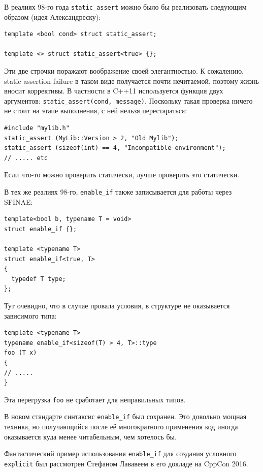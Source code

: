 \documentclass[a4paper,12pt,oneside]{article}
\begin{document}
В реалиях 98-го года \lstinline!static_assert! можно было бы реализовать следующим образом (идея Александреску):

\begin{lstlisting}
template <bool cond> struct static_assert;

template <> struct static_assert<true> {};
\end{lstlisting}

Эти две строчки поражают воображение своей элегантностью. К сожалению, static assertion failure в таком виде получается почти нечитаемой, поэтому жизнь вносит коррективы. В частности в C++11 используется функция двух аргументов: \lstinline!static_assert(cond, message)!. Поскольку такая проверка ничего не стоит на этапе выполнения, с ней нельзя перестараться:

\begin{lstlisting}
#include "mylib.h"
static_assert (MyLib::Version > 2, "Old Mylib");
static_assert (sizeof(int) == 4, "Incompatible environment");
// ..... etc
\end{lstlisting}

Если что-то можно проверить статически, лучше проверить это статически.

В тех же реалиях 98-го, \lstinline!enable_if! также записывается для работы через SFINAE:

\begin{lstlisting}
template<bool b, typename T = void>
struct enable_if {};

template <typename T>
struct enable_if<true, T> 
{
  typedef T type;
};
\end{lstlisting}

Тут очевидно, что в случае провала условия, в структуре не оказывается зависимого типа:

\begin{lstlisting}
template <typename T>
typename enable_if<sizeof(T) > 4, T>::type
foo (T x) 
{ 
// .....
}
\end{lstlisting}

Эта перегрузка \lstinline!foo! не сработает для неправильных типов.

В новом стандарте синтаксис \lstinline!enable_if! был сохранен. Это довольно мощная техника, но получающийся после её многократного применения код иногда оказывается куда менее читабельным, чем хотелось бы.

Фантастический пример использования \lstinline!enable_if! для создания условного \lstinline!explicit! был рассмотрен Стефаном Лававеем в его докладе на CppCon 2016.
\end{document}
